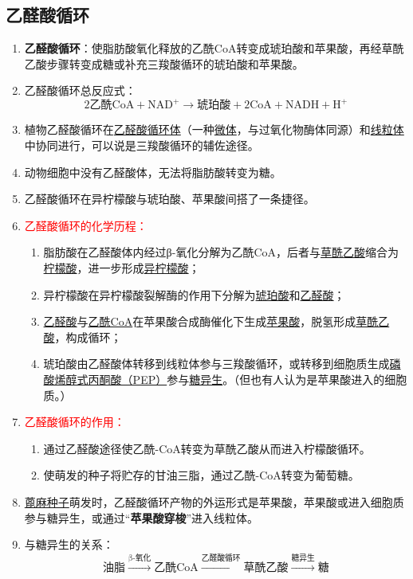 \subsection{乙醛酸循环}
\begin{enumerate}
    \item \textbf{乙醛酸循环}：使脂肪酸氧化释放的乙酰CoA转变成琥珀酸和苹果酸，再经草酰乙酸步骤转变成糖或补充三羧酸循环的琥珀酸和苹果酸。
    \item 乙醛酸循环总反应式：
    \[
        2\text{乙酰CoA}+\text{NAD}^+\to\text{琥珀酸}+2\text{CoA}+\text{NADH}+\text{H}^+
    \]
    \item 植物乙醛酸循环在\uline{乙醛酸循环体}（一种\uline{微体}，与过氧化物酶体同源）和\uline{线粒体}中协同进行，可以说是三羧酸循环的辅佐途径。
    \item 动物细胞中没有乙醛酸体，无法将脂肪酸转变为糖。 
    \item 乙醛酸循环在异柠檬酸与琥珀酸、苹果酸间搭了一条捷径。
    \item \textcolor{red}{乙醛酸循环的化学历程：}
    \begin{enumerate}
        \item 脂肪酸在乙醛酸体内经过β-氧化分解为乙酰CoA，后者与\uline{草酰乙酸}缩合为\uline{柠檬酸}，进一步形成\uline{异柠檬酸}；
        \item 异柠檬酸在异柠檬酸裂解酶的作用下分解为\uline{琥珀酸}和\uline{乙醛酸}；
        \item \uline{乙醛酸}与\uline{乙酰CoA}在苹果酸合成酶催化下生成\uline{苹果酸}，脱氢形成\uline{草酰乙酸}，构成循环；
        \item 琥珀酸由乙醛酸体转移到线粒体参与三羧酸循环，或转移到细胞质生成\uline{磷酸烯醇式丙酮酸（PEP）}参与\uline{糖异生}。（但也有人认为是苹果酸进入的细胞质。）
    \end{enumerate}
    \item \textcolor{red}{乙醛酸循环的作用：}
    \begin{enumerate}
        \item 通过乙醛酸途径使乙酰-CoA转变为草酰乙酸从而进入柠檬酸循环。
        \item 使萌发的种子将贮存的甘油三脂，通过乙酰-CoA转变为葡萄糖。 
    \end{enumerate}
    \item \uline{蓖麻种子}萌发时，乙醛酸循环产物的外运形式是苹果酸，苹果酸或进入细胞质参与糖异生，或通过“\textbf{苹果酸穿梭}”进入线粒体。
    \item 与糖异生的关系：
    \[
        \text{油脂}\overset{\text{β-氧化}}\longrightarrow\text{乙酰CoA}\overset{\text{乙醛酸循环}}\longrightarrow\text{草酰乙酸}\overset{糖异生}\longrightarrow\text{糖}
    \]
\end{enumerate}


